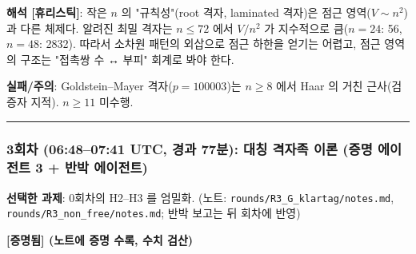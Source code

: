 \textbf{해석 {[}휴리스틱{]}}: 작은 \(n\) 의 "규칙성"(root 격자, laminated 격자)은 점근 영역(\(V\sim n^2\))과 다른 체제다. 알려진 최밀 격자는 \(n\le 72\) 에서 \(V/n^2\) 가 지수적으로 큼(\(n=24\): 56, \(n=48\): 2832). 따라서 소차원 패턴의 외삽으로 점근 하한을 얻기는 어렵고, 점근 영역의 구조는 "접촉쌍 수 ↔ 부피" 회계로 봐야 한다.

\textbf{실패/주의}: Goldstein--Mayer 격자(\(p=100003\))는 \(n\ge8\) 에서 Haar 의 거친 근사(검증자 지적). \(n\ge11\) 미수행.

\begin{center}\rule{0.5\linewidth}{0.5pt}\end{center}

\hypertarget{uxd68cuxcc28-06480741-utc-uxacbduxacfc-77uxbd84-uxb300uxce6d-uxaca9uxc790uxc871-uxc774uxb860-uxc99duxba85-uxc5d0uxc774uxc804uxd2b8-3-uxbc18uxbc15-uxc5d0uxc774uxc804uxd2b8}{%
\subsubsection*{3회차 (06:48--07:41 UTC, 경과 77분): 대칭 격자족 이론 (증명 에이전트 3 + 반박 에이전트)}\label{uxd68cuxcc28-06480741-utc-uxacbduxacfc-77uxbd84-uxb300uxce6d-uxaca9uxc790uxc871-uxc774uxb860-uxc99duxba85-uxc5d0uxc774uxc804uxd2b8-3-uxbc18uxbc15-uxc5d0uxc774uxc804uxd2b8}}

\textbf{선택한 과제}: 0회차의 H2--H3 를 엄밀화. (노트: \texttt{rounds/R3\_G\_klartag/notes.md}, \texttt{rounds/R3\_non\_free/notes.md}; 반박 보고는 뒤 회차에 반영)

\textbf{{[}증명됨{]} (노트에 증명 수록, 수치 검산)}

